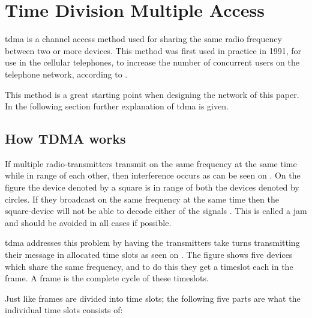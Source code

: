 \chapter{Time Division Multiple Access}\label{TDMA}

\gls{tdma} is a channel access method used for sharing the same radio frequency between two or more devices.
This method was first used in practice in 1991, for use in the cellular telephones, to increase the number of concurrent users on the telephone network, according to \citet{networkencyclopedia2013time}.

This method is a great starting point when designing the network of this paper.
In the following section further explanation of \gls{tdma} is given.

\section{How TDMA works}

If multiple radio-transmitters transmit on the same frequency at the same time while in range of each other, then interference occurs as can be seen on . 
On the figure the device denoted by a square is in range of both the devices denoted by circles. 
If they broadcast on the same frequency at the same time then the square-device will not be able to decode either of the signals \cite{networkencyclopedia2013time, networkencyclopedia2013advanced}.
This is called a jam and should be avoided in all cases if possible.


\gls{tdma} addresses this problem by having the transmitters take turns transmitting their message in allocated time slots as seen on .
The figure shows five devices which share the same frequency, and to do this they get a timeslot each in the frame.
A frame is the complete cycle of these timeslots.


\noindent
Just like frames are divided into time slots; the following five parts are what the individual time slots consists of:

